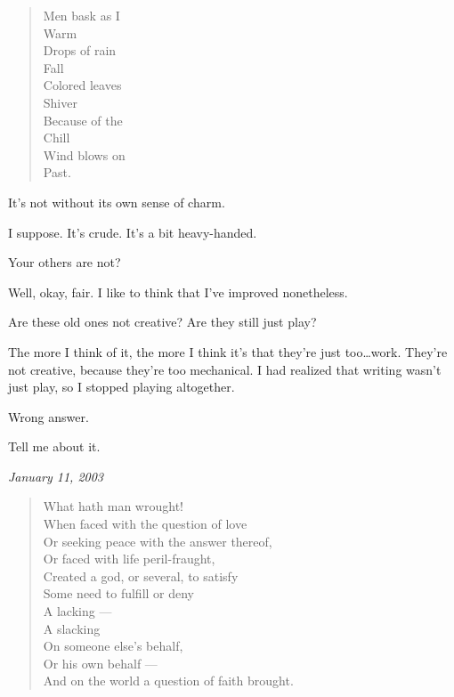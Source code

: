 \begin{leftcolumn}
\begin{verse}
  Men bask as I\\
  \vin \vin Warm\\
  Drops of rain\\
  \vin \vin Fall\\
  Colored leaves\\
  \vin \vin Shiver\\
  Because of the\\
  \vin \vin Chill\\
  Wind blows on\\
  \vin \vin Past.
\end{verse}
\newpage

\begin{ally}
It's not without its own sense of charm.
\end{ally}
I suppose. It's crude. It's a bit heavy-handed.

\begin{ally}
Your others are not?
\end{ally}
Well, okay, fair. I like to think that I've improved nonetheless.

\begin{ally}
Are these old ones not creative? Are they still just play?
\end{ally}
The more I think of it, the more I think it's that they're just too\ldots{}work. They're not creative, because they're too mechanical. I had realized that writing wasn't just play, so I stopped playing altogether.

\begin{ally}
Wrong answer.
\end{ally}
Tell me about it.
\newpage


\emph{January 11, 2003}

\begin{verse}
What hath man wrought!\\
\vin When faced with the question of love\\
\vin Or seeking peace with the answer thereof,\\
Or faced with life peril-fraught,\\
\vin Created a god, or several, to satisfy\\
\vin Some need to fulfill or deny\\
\vin \vin A lacking ---\\
\vin \vin A slacking\\
\vin On someone else's behalf,\\
\vin Or his own behalf ---\\
And on the world a question of faith brought.


\end{verse}
\end{leftcolumn}
